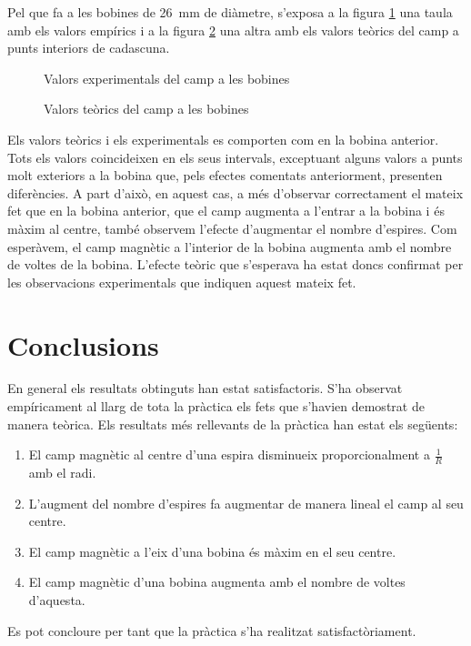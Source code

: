 Pel que fa a les bobines de \SI{26}{mm} de diàmetre, s'exposa a la figura \cref{tab:camp experimentals} una taula amb els valors empírics i a la figura \cref{tab:camps teorics} una altra amb els valors teòrics del camp a punts interiors de cadascuna.

\begin{figure}[htb]
  \centering
  \caption{Valors experimentals del camp a les bobines}
  \label{tab:camp experimentals}
\end{figure}

\begin{figure}[htb]
  \centering
  \caption{Valors teòrics del camp a les bobines}
  \label{tab:camps teorics}
\end{figure}

Els valors teòrics i els experimentals es comporten com en la bobina anterior. Tots els valors coincideixen en els seus intervals, exceptuant alguns valors a punts molt exteriors a la bobina que, pels efectes comentats anteriorment, presenten diferències. A part d'això, en aquest cas, a més d'observar correctament el mateix fet que en la bobina anterior, que el camp augmenta a l'entrar a la bobina i és màxim al centre, també observem l'efecte d'augmentar el nombre d'espires. Com esperàvem, el camp magnètic a l'interior de la bobina augmenta amb el nombre de voltes de la bobina. L'efecte teòric que s'esperava ha estat doncs confirmat per les observacions experimentals que indiquen aquest mateix fet.

\section{Conclusions}

En general els resultats obtinguts han estat satisfactoris. S'ha observat empíricament al llarg de tota la pràctica els fets que s'havien demostrat de manera teòrica. Els resultats més rellevants de la pràctica han estat els següents:
\begin{enumerate}
  \item El camp magnètic al centre d'una espira disminueix proporcionalment a \(\frac{1}{R}\) amb el radi.
  \item L'augment del nombre d'espires fa augmentar de manera lineal el camp al seu centre.
  \item El camp magnètic a l'eix d'una bobina és màxim en el seu centre.
  \item El camp magnètic d'una bobina augmenta amb el nombre de voltes d'aquesta.
\end{enumerate}
Es pot concloure per tant que la pràctica s'ha realitzat satisfactòriament.

